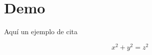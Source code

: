 \documentclass[twoside,11pt]{PlantillaTFG}
\begin{document}
	\maketitle

	\frontmatter
	
		
	
	
	
	
	\tableofcontents
	
	\mainmatter

	\pagestyle{fancy}
	\chapter{Demo}
	Aquí un ejemplo de cita \cite{miprimerabiblio}
	\begin{teorema}
		$$x^2+y^2=z^2$$
	\end{teorema}
	\lipsum[1-10]
	
	
	
	
\end{document}
